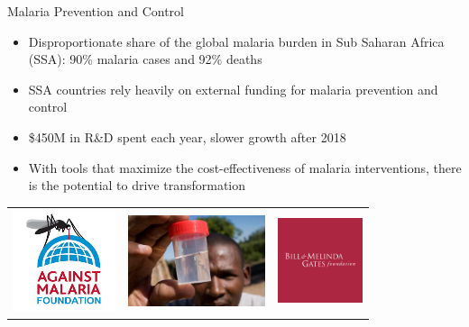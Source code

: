 \documentclass[10pt,usenames,dvipsnames]{beamer}
\begin{document}
\begin{frame}{Malaria Prevention and Control}
\begin{itemize}

\item Disproportionate share of the global malaria burden in Sub Saharan Africa (SSA): 90\% malaria cases and 92\% deaths 

\item SSA countries rely heavily on external funding for malaria prevention and control \cite{Winskill2011}

\item  \$450M in R\&D spent each year, slower growth after 2018 \cite{moran2007malaria}

\item With tools that maximize the cost-effectiveness of malaria interventions, there is the potential to drive transformation

\end{itemize}

% 
% 

\centering
        \begin{tabular}{ccc}
        
        \includegraphics[width=3cm]{images/AMF.png}
        &
         \includegraphics[width=4cm]{images/Research.jpg}
         &
         \includegraphics[width=2.5cm]{images/BillM.jpg}
        

\end{tabular}
\end{frame}
\end{document}
